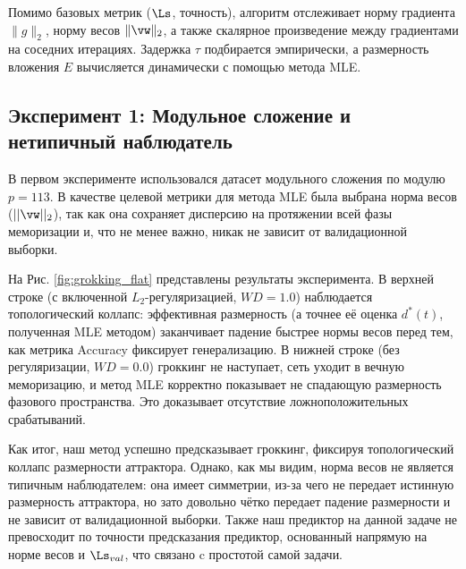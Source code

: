\documentclass{article}
\begin{document}
Помимо базовых метрик ($\Ls$, точность), алгоритм отслеживает норму градиента $\|g\|_2$, норму весов $\|\vw\|_2$, а также скалярное произведение между градиентами на соседних итерациях. Задержка $\tau$ подбирается эмпирически, а размерность вложения $E$ вычисляется динамически с помощью метода MLE.

\subsection{Эксперимент 1: Модульное сложение и нетипичный наблюдатель}

В первом эксперименте использовался датасет модульного сложения по модулю $p=113$. В качестве целевой метрики для метода MLE была выбрана норма весов ($||\vw||_2$), так как она сохраняет дисперсию на протяжении всей фазы меморизации и, что не менее важно, никак не зависит от валидационной выборки.

На Рис. \ref{fig:grokking_flat} представлены результаты эксперимента. В верхней строке (с включенной $L_2$-регуляризацией, $WD=1.0$) наблюдается топологический коллапс: эффективная размерность (а точнее её оценка $d^*(t)$, полученная MLE методом) заканчивает падение быстрее нормы весов перед тем, как метрика Accuracy фиксирует генерализацию. В нижней строке (без регуляризации, $WD=0.0$) гроккинг не наступает, сеть уходит в вечную меморизацию, и метод MLE корректно показывает не спадающую размерность фазового пространства. Это доказывает отсутствие ложноположительных срабатываний.

Как итог, наш метод успешно предсказывает гроккинг, фиксируя топологический коллапс размерности аттрактора. Однако, как мы видим, норма весов не является типичным наблюдателем: она имеет симметрии, из-за чего не передает истинную размерность аттрактора, но зато довольно чётко передает падение размерности и не зависит от валидационной выборки. Также наш предиктор на данной задаче не превосходит по точности предсказания предиктор, основанный напрямую на норме весов и $\Ls_{val}$, что связано c простотой самой задачи.
\end{document}
